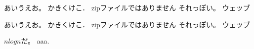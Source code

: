 あいうえお。
かきくけこ．
zipファイルではありません
それっぽい。
ウェッブ

あいうえお。
かきくけこ．
zipファイルではありません
それっぽい。
ウェッブ

$n log n$だ。
aaa.\cite{bbb:123}
